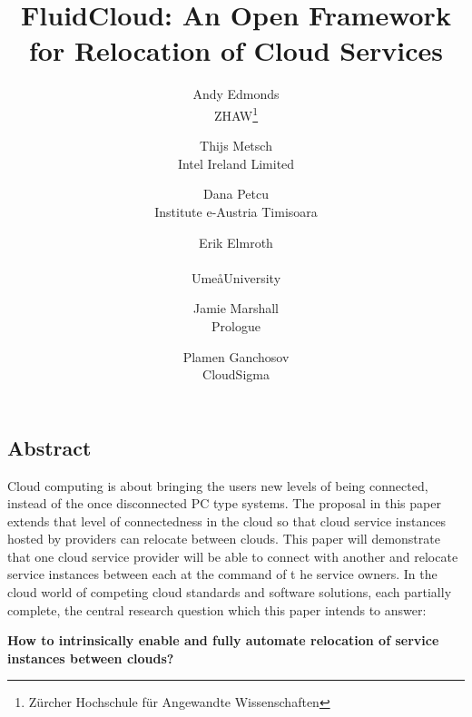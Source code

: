 \documentclass[letterpaper,twocolumn,10pt]{article}
\begin{document}
\date{}

\title{\Large \bf FluidCloud: An Open Framework for Relocation of Cloud Services}

\author{
{\rm Andy Edmonds}\\
ZHAW\footnote{Z\"urcher Hochschule f\"ur Angewandte Wissenschaften}
\and
{\rm Thijs Metsch}\\
Intel Ireland Limited
\and
{\rm Dana Petcu}\\
Institute e-Austria Timisoara
\and
{\rm Erik Elmroth}\\
\\Ume\aa  University
\and
{\rm Jamie Marshall}\\
Prologue
\and
{\rm Plamen Ganchosov}\\
CloudSigma
}

\maketitle


\subsection*{Abstract}

Cloud computing is about bringing the users new levels of being connected, 
instead of the once disconnected PC type systems. The proposal in this paper extends 
that level of connectedness in the cloud so that cloud service instances 
hosted by providers can relocate between clouds. This paper will 
demonstrate that one cloud service provider will be able to connect with 
another and relocate service instances between each at the command of t
he service owners. In the cloud world of competing cloud standards and 
software solutions, each partially complete, the central research question which this paper intends to answer:

\textbf{How to intrinsically enable and fully automate relocation of service instances between clouds?}
\end{document}
